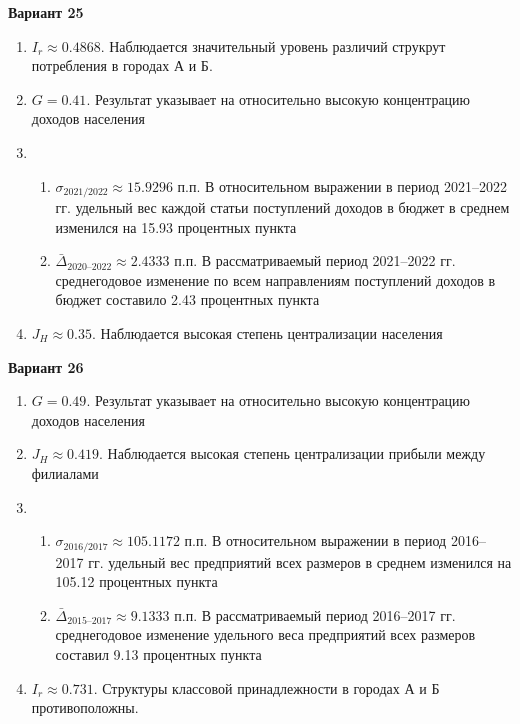 \documentclass{article}
\begin{document}
\textbf{Вариант 25}
\begin{enumerate}
\item $I_r\approx 0.4868$. Наблюдается значительный уровень различий струкрут потребления в городах А и Б.
\item $G= 0.41$. Результат указывает на относительно высокую концентрацию доходов населения
\item \begin{enumerate} \item $\sigma_\text{2021/2022}\approx 15.9296$ п.п. В относительном выражении в период 2021--2022 гг. удельный вес каждой статьи поступлений доходов в бюджет в среднем изменился на 15.93 процентных пункта
\item $\bar\Delta_\text{2020--2022}\approx 2.4333$ п.п. В рассматриваемый период 2021--2022 гг. среднегодовое изменение по всем направлениям поступлений доходов в бюджет составило 2.43 процентных пункта\end{enumerate}
\item $J_H \approx 0.35$. Наблюдается высокая степень централизации населения
\end{enumerate}

\textbf{Вариант 26}
\begin{enumerate}
\item $G= 0.49$. Результат указывает на относительно высокую концентрацию доходов населения
\item $J_H \approx 0.419$. Наблюдается высокая степень централизации прибыли между филиалами
\item \begin{enumerate} \item $\sigma_\text{2016/2017}\approx 105.1172$ п.п. В относительном выражении в период 2016--2017 гг. удельный вес предприятий всех размеров в среднем изменился на 105.12 процентных пункта
\item $\bar\Delta_\text{2015--2017}\approx 9.1333$ п.п. В рассматриваемый период 2016--2017 гг. среднегодовое изменение удельного веса предприятий всех размеров составил 9.13 процентных пункта\end{enumerate}
\item $I_r\approx 0.731$. Структуры классовой принадлежности в городах А и Б противоположны.
\end{enumerate}
\end{document}
